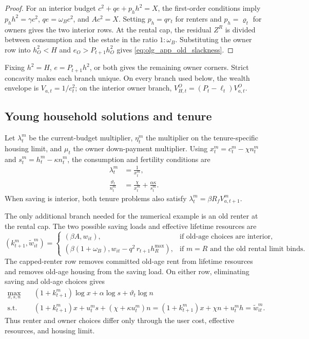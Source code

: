 \begin{proof}
For an interior budget $c^2+qe+p_hh^2=X$, the first-order conditions imply
$p_hh^2=\gamma c^2$, $qe=\omega_Bc^2$, and $Ac^2=X$.  Setting
$p_h=qr_t$ for renters and $p_h=\varrho_t$ for owners gives the two interior
rows.  At the rental cap, the residual $Z^R$ is divided between consumption and
the estate in the ratio $1:\omega_B$.  Substituting the owner row into
$h_O^2<H$ and $e_O>P_{t+1}h_O^2$ gives
\eqref{eq:olg_app_old_slackness}.
\end{proof}

Fixing $h^2=H$, $e=P_{t+1}h^2$, or both gives the remaining owner corners.
Strict concavity makes each branch unique.  On every branch used below, the
wealth envelope is $V_{a,t}=1/c_t^2$; on the interior owner branch,
$V_{H,t}^O=(P_t-\ell_t)V_{a,t}^O$.

\subsection{Young household solutions and tenure}
\label{app:olg_young_households}

Let $\lambda_t^m$ be the current-budget multiplier, $\eta_t^m$ the multiplier
on the tenure-specific housing limit, and $\mu_t$ the owner down-payment
multiplier.  Using $x_t^m=c_t^m-\chi n_t^m$ and
$s_t^m=h_t^m-\kappa n_t^m$, the consumption and fertility conditions are
\begin{align}
 \lambda_t^m&=\frac1{x_t^m},
 \label{eq:olg_app_young_lambda}\\
 \frac{\vartheta_t}{n_t^m}
 &=\frac{\chi}{x_t^m}+\frac{\alpha\kappa}{s_t^m}.
 \label{eq:olg_app_young_fertility_kkt}
\end{align}
When saving is interior, both tenure problems also satisfy
$\lambda_t^m=\beta R_fV_{a,t+1}^m$.

The only additional branch needed for the numerical example is an old renter
at the rental cap.  The two possible saving loads and effective lifetime
resources are
\begin{equation}
 (k_{t+1}^m,\widetilde w_{it}^m)=
 \begin{cases}
 (\beta A,w_{it}),&\text{if old-age choices are interior},\\
 (\beta(1+\omega_B),w_{it}-q^2\,r_{t+1}h_R^{\max}),
 &\text{if $m=R$ and the old rental limit binds}.
 \end{cases}
 \label{eq:olg_old_branch_objects}
\end{equation}
The capped-renter row removes committed old-age rent from lifetime resources
and removes old-age housing from the saving load.  On either row, eliminating
saving and old-age choices gives
\begin{align}
 \max_{x,s,n}\quad &(1+k_{t+1}^m)\log x+\alpha\log s+
 \vartheta_t\log n \nonumber\\
 \text{s.t.}\quad &(1+k_{t+1}^m)x+u_t^m s+
 (\chi+\kappa u_t^m)n
 =(1+k_{t+1}^m)x+\chi n+u_t^mh
 =\widetilde w_{it}^m.
 \label{eq:olg_lifetime_budget}
\end{align}
Thus renter and owner choices differ only through the user cost, effective
resources, and housing limit.


